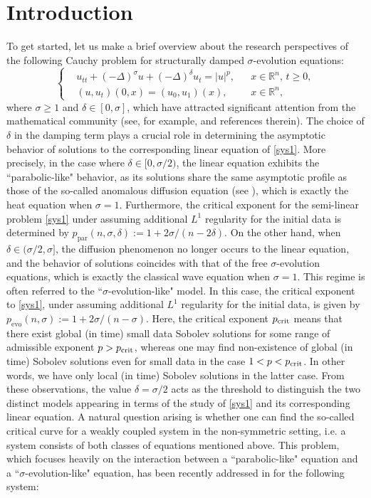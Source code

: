 \documentclass[11pt,reqno]{amsart}
\numberwithin{equation}{section}
\begin{document}
\section{Introduction}
To get started, let us make a brief overview about the research perspectives of the following Cauchy problem for structurally damped $\sigma$-evolution equations:
\begin{equation}\label{sys1}
\left\{
\begin{aligned}
&u_{tt}+(-\Delta)^{\sigma}u+(-\Delta)^{\delta}u_t=|u|^p, &&x\in \mathbb{R}^n,\, t\geq 0,\\
&(u,u_t)(0,x)= (u_0,u_1)(x), &&x\in \mathbb{R}^n,
\end{aligned}
\right.
\end{equation}
where $\sigma\ge 1$ and $\delta\in [0,\sigma]$, which have attracted significant attention from the mathematical community (see, for example, \cite{Mat1976,Duong2015,Dao2019,ADL2024} and references therein). The choice of $\delta$ in the damping term plays a crucial role in determining the asymptotic behavior of solutions to the corresponding linear equation of \eqref{sys1}. More precisely, in the case where $\delta \in [0, \sigma/2)$, the linear equation exhibits the ``parabolic-like" behavior, as its solutions share the same asymptotic profile as those of the so-called anomalous diffusion equation (see \cite{D'Abbicco2017}), which is exactly the heat equation when $\sigma=1$. Furthermore, the critical exponent for the semi-linear problem \eqref{sys1} under assuming additional $L^1$ regularity for the initial data is determined by $p_{\mathrm{par}}(n,\sigma,\delta) := 1 +2\sigma/(n-2\delta)$. On the other hand, when $\delta \in (\sigma/2,\sigma]$, the diffusion phenomenon no longer occurs to the linear equation, and the behavior of solutions coincides with that of the free $\sigma$-evolution equations, which is exactly the classical wave equation when $\sigma=1$. This regime is often referred to the ``$\sigma$-evolution-like" model. In this case, the critical exponent to \eqref{sys1}, under assuming additional $L^1$ regularity for the initial data, is given by $p_{\mathrm{evo}}(n,\sigma) := 1 + 2\sigma/(n-\sigma)$. Here, the critical exponent $p_{\rm crit}$ means that there exist global (in time) small data Sobolev solutions for some range of admissible exponent $p>p_{\rm crit}$, whereas one may find non-existence of global (in time) Sobolev solutions even for small data in the case $1< p < p_{\rm crit}$. In other words, we have only local (in time) Sobolev solutions in the latter case. From these observations, the value $\delta = \sigma/2$ acts as the threshold to distinguish the two distinct models appearing in terms of the study of \eqref{sys1} and its corresponding linear equation. A natural question arising is whether one can find the so-called critical curve for a weakly coupled system in the non-symmetric setting, i.e. a system consists of both classes of equations mentioned above. This problem, which focuses heavily on the interaction between a ``parabolic-like" equation and a ``$\sigma$-evolution-like" equation, has been recently addressed in \cite{DuongDaoRei2025} for the following system:
\end{document}

